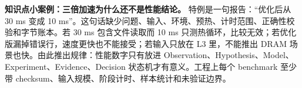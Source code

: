 \begin{casebox}
\textbf{知识点小案例：三倍加速为什么还不是性能结论。}
特例是一句报告：“优化后从 30 ms 变成 10 ms”。这句话缺少问题、输入、环境、预热、计时范围、正确性校验和字节账本。若 30 ms 包含文件读取而 10 ms 只测热循环，比较无效；若优化版漏掉错误行，速度更快也不能接受；若输入只放在 L3 里，不能推出 DRAM 场景也快。由此推出规律：性能数字只有放进 Observation、Hypothesis、Model、Experiment、Evidence、Decision 状态机才有意义。工程上每个 benchmark 至少带 checksum、输入规模、阶段计时、样本统计和未验证边界。
\end{casebox}
